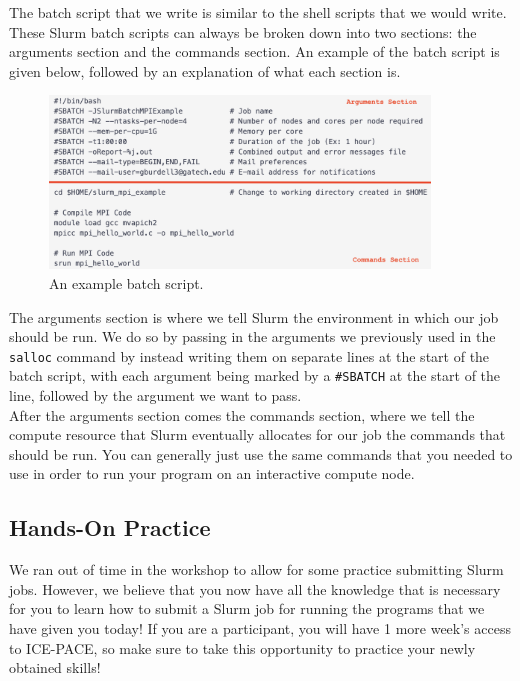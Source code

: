 \documentclass{article}
\begin{document}
\noindent The batch script that we write is similar to the shell scripts that we would write. These Slurm batch scripts can always be broken down into two sections: the arguments section and the commands section. An example of the batch script is given below, followed by an explanation of what each section is. 

\begin{figure}[H]
    \centering
    \includegraphics[width=0.9\textwidth]{img/Screenshot 2025-09-07 at 21.59.40.png}
    \caption{An example batch script.}
\end{figure}

\noindent The arguments section is where we tell Slurm the environment in which our job should be run. We do so by passing in the arguments we previously used in the \texttt{salloc} command by instead writing them on separate lines at the start of the batch script, with each argument being marked by a \texttt{\#SBATCH} at the start of the line, followed by the argument we want to pass. \\ 

\noindent After the arguments section comes the commands section, where we tell the compute resource that Slurm eventually allocates for our job the commands that should be run. You can generally just use the same commands that you needed to use in order to run your program on an interactive compute node.

\subsection{Hands-On Practice}

We ran out of time in the workshop to allow for some practice submitting Slurm jobs. However, we believe that you now have all the knowledge that is necessary for you to learn how to submit a Slurm job for running the programs that we have given you today! If you are a participant, you will have 1 more week's access to ICE-PACE, so make sure to take this opportunity to practice your newly obtained skills!
\end{document}
